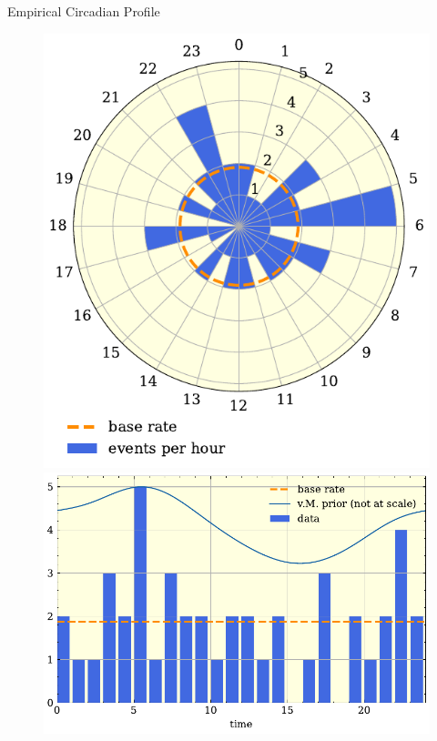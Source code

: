 \documentclass[t]{beamer}
\theoremstyle{definition}
\begin{document}
\begin{frame}
\begin{columns}
    \begin{column}{0.45\textwidth}
        \begin{block}{Empirical Circadian Profile}
        \begin{figure}
            \begin{overprint}
            \centering
            \includegraphics[width=\textwidth]{figs/polar_hist.pdf}
            \centering
            \includegraphics[width=\textwidth]{figs/vm_prior.pdf}
            \end{overprint}
        \end{figure}
        \end{block}
        

\end{column}
\end{columns}
\end{frame}
\end{document}
